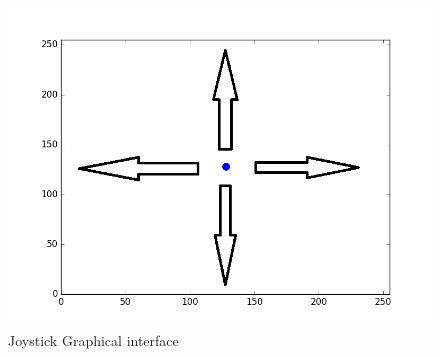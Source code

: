 \documentclass[a4paper,12pt,oneside]{book}
\begin{document}
\begin{figure}
\centering
\includegraphics[scale=0.4]{joystickgui.png}
\caption{Joystick Graphical interface}
\end{figure}


\end{document}
